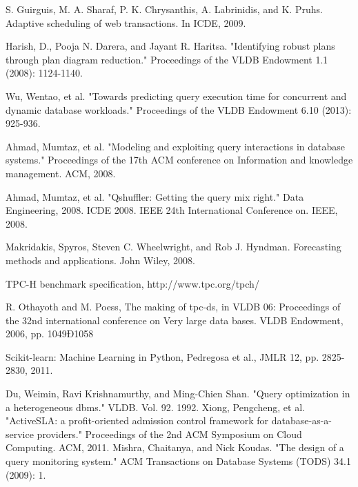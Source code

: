 \documentclass{article}
\begin{document}
\begin{multicols}{2}
\begin{thebibliography}{9}
     S. Guirguis, M. A. Sharaf, P. K. Chrysanthis, A. Labrinidis, and
	K. Pruhs. Adaptive scheduling of web transactions. In ICDE, 2009.
	
	Harish, D., Pooja N. Darera, and Jayant R. Haritsa. "Identifying robust plans through plan diagram 			reduction." Proceedings of the VLDB Endowment 1.1 (2008): 1124-1140.
	
	Wu, Wentao, et al. "Towards predicting query execution time for concurrent and dynamic database 			workloads." Proceedings of the VLDB Endowment 6.10 (2013): 925-936.
	
	Ahmad, Mumtaz, et al. "Modeling and exploiting query interactions in database systems." Proceedings of the 17th ACM conference on Information and knowledge management. ACM, 2008.
	
	Ahmad, Mumtaz, et al. "Qshuffler: Getting the query mix right." Data Engineering, 2008. ICDE 2008. IEEE 24th International Conference on. IEEE, 2008.

	
	Makridakis, Spyros, Steven C. Wheelwright, and Rob J. Hyndman. Forecasting methods and applications. John Wiley, 2008.
	
	TPC-H benchmark specification, http://www.tpc.org/tpch/
	
	R. Othayoth and M. Poess, The making of tpc-ds, in VLDB
	06: Proceedings of the 32nd international conference on Very
	large data bases. VLDB Endowment, 2006, pp. 1049Ð1058
	
	Scikit-learn: Machine Learning in Python, Pedregosa et al., JMLR 12, pp. 2825-2830, 2011.
	
	Du, Weimin, Ravi Krishnamurthy, and Ming-Chien Shan. "Query optimization in a heterogeneous dbms." 		VLDB. Vol. 92. 1992.
	Xiong, Pengcheng, et al. "ActiveSLA: a profit-oriented admission control framework for database-as-a-		service providers." Proceedings of the 2nd ACM Symposium on Cloud Computing. ACM, 2011.	
	Mishra, Chaitanya, and Nick Koudas. "The design of a query monitoring system." ACM Transactions on 		Database Systems (TODS) 34.1 (2009): 1.
	
	\end{thebibliography}
	\end{multicols}
\end{document}
